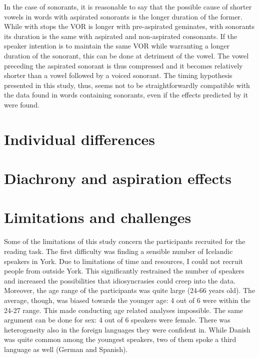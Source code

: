 \documentclass[11pt,a4paper,openany]{memoir}\usepackage[]{graphicx}\usepackage[]{color}
\begin{document}
In the case of sonorants, it is reasonable to say that the possible cause of shorter vowels in words with aspirated sonorants is the longer duration of the former.
While with stops the VOR is longer with pre-aspirated geminates, with sonorants its duration is the same with aspirated and non-aspirated consonants.
If the speaker intention is to maintain the same VOR while warranting a longer duration of the sonorant, this can be done at detriment of the vowel.
The vowel preceding the aspirated sonorant is thus compressed and it becomes relatively shorter than a vowel followed by a voiced sonorant.
The timing hypothesis presented in this study, thus, seems not to be straightforwardly compatible with the data found in words containing sonorants, even if the effects predicted by it were found.



\section{Individual differences}


\section{Diachrony and aspiration effects}


\section{Limitations and challenges}

Some of the limitations of this study concern the participants recruited for the reading task.
The first difficulty was finding a sensible number of Icelandic speakers in York.
Due to limitations of time and resources, I could not recruit people from outside York.
This significantly restrained the number of speakers and increased the possibilities that idiosyncrasies could creep into the data.
Moreover, the age range of the participants was quite large (24-66 years old).
The average, though, was biased towards the younger age: 4 out of 6 were within the 24-27 range.
This made conducting age related analyses impossible.
The same argument can be done for sex: 4 out of 6 speakers were female.
There was heterogeneity also in the foreign languages they were confident in.
While Danish was quite common among the youngest speakers, two of them spoke a third language as well (German and Spanish).
\end{document}
